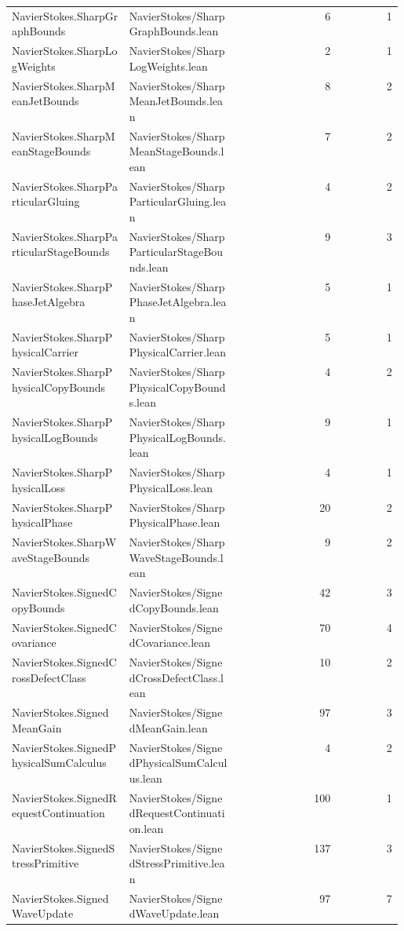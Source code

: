 \begin{longtable}{p{0.30\linewidth}p{0.28\linewidth}rr}
NavierStokes.SharpGraphBounds & NavierStokes/SharpGraphBounds.lean & 6 & 1\\
NavierStokes.SharpLogWeights & NavierStokes/SharpLogWeights.lean & 2 & 1\\
NavierStokes.SharpMeanJetBounds & NavierStokes/SharpMeanJetBounds.lean & 8 & 2\\
NavierStokes.SharpMeanStageBounds & NavierStokes/SharpMeanStageBounds.lean & 7 & 2\\
NavierStokes.SharpParticularGluing & NavierStokes/SharpParticularGluing.lean & 4 & 2\\
NavierStokes.SharpParticularStageBounds & NavierStokes/SharpParticularStageBounds.lean & 9 & 3\\
NavierStokes.SharpPhaseJetAlgebra & NavierStokes/SharpPhaseJetAlgebra.lean & 5 & 1\\
NavierStokes.SharpPhysicalCarrier & NavierStokes/SharpPhysicalCarrier.lean & 5 & 1\\
NavierStokes.SharpPhysicalCopyBounds & NavierStokes/SharpPhysicalCopyBounds.lean & 4 & 2\\
NavierStokes.SharpPhysicalLogBounds & NavierStokes/SharpPhysicalLogBounds.lean & 9 & 1\\
NavierStokes.SharpPhysicalLoss & NavierStokes/SharpPhysicalLoss.lean & 4 & 1\\
NavierStokes.SharpPhysicalPhase & NavierStokes/SharpPhysicalPhase.lean & 20 & 2\\
NavierStokes.SharpWaveStageBounds & NavierStokes/SharpWaveStageBounds.lean & 9 & 2\\
NavierStokes.SignedCopyBounds & NavierStokes/SignedCopyBounds.lean & 42 & 3\\
NavierStokes.SignedCovariance & NavierStokes/SignedCovariance.lean & 70 & 4\\
NavierStokes.SignedCrossDefectClass & NavierStokes/SignedCrossDefectClass.lean & 10 & 2\\
NavierStokes.SignedMeanGain & NavierStokes/SignedMeanGain.lean & 97 & 3\\
NavierStokes.SignedPhysicalSumCalculus & NavierStokes/SignedPhysicalSumCalculus.lean & 4 & 2\\
NavierStokes.SignedRequestContinuation & NavierStokes/SignedRequestContinuation.lean & 100 & 1\\
NavierStokes.SignedStressPrimitive & NavierStokes/SignedStressPrimitive.lean & 137 & 3\\
NavierStokes.SignedWaveUpdate & NavierStokes/SignedWaveUpdate.lean & 97 & 7\\

\end{longtable}
